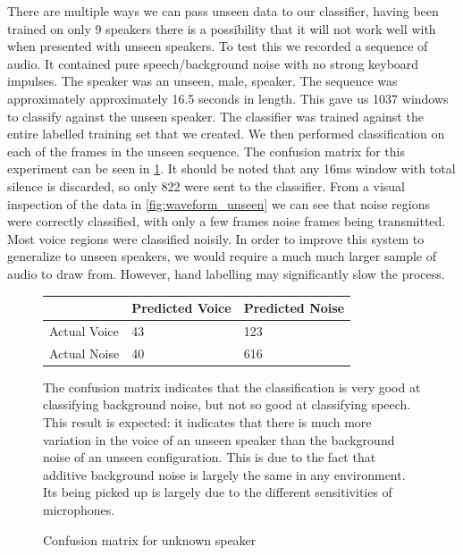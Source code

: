 \documentclass[ %
                    author={Sam Phippen},
                supervisor={Dr. Rafal Bogacz},
                     title={Real time voice activity detectors in noisy personal computing environments},
                  subtitle={},
                    degree={MEng},
                      year={2012} ]{thesis}
\begin{document}
There are multiple ways we can pass unseen data to our classifier, having been
trained on only 9 speakers there is a possibility that it will not work well
with when presented with unseen speakers. To test this we recorded a sequence
of audio. It contained pure speech/background noise with no strong keyboard
impulses. The speaker was an unseen, male, speaker. The sequence was
approximately approximately 16.5 seconds in length. This gave us 1037 windows
to classify against the unseen speaker. The classifier was trained against the
entire labelled training set that we created. We then performed classification
on each of the frames in the unseen sequence. The confusion matrix for this
experiment can be seen in \ref{table:confusion_unseen}. It should be noted that
any 16ms window with total silence is discarded, so only 822 were sent to the
classifier. From a visual inspection of the data in \ref{fig:waveform_unseen}
we can see that noise regions were correctly classified, with only a few frames
noise frames being transmitted. Most voice regions were classified noisily. In
order to improve this system to generalize to unseen speakers, we would require
a much much larger sample of audio to draw from. However, hand labelling may
significantly slow the process.


\begin{figure}
    \label{table:confusion_unseen}
    \begin{center}
        \begin{tabular}{| l | l | l |}
            \hline
            & Predicted Voice & Predicted Noise \\ \hline
            Actual Voice & 43 & 123 \\
            Actual Noise & 40 & 616 \\ \hline
        \end{tabular}
    \end{center}
    \vspace{\baselineskip}

    The confusion matrix indicates that the classification is very good at
    classifying background noise, but not so good at classifying speech. This
    result is expected: it indicates that there is much more variation in the
    voice of an unseen speaker than the background noise of an unseen
    configuration. This is due to the fact that additive background noise is
    largely the same in any environment. Its being picked up is largely due
    to the different sensitivities of microphones.

    \caption{Confusion matrix for unknown speaker}
\end{figure}
\end{document}
